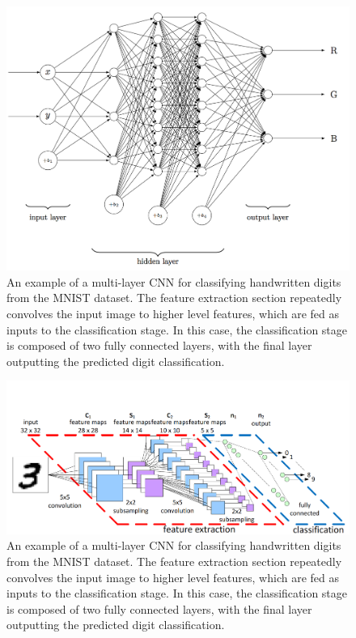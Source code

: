 \documentclass[12pt,oneside,onecolumn,a4paper]{article}
\begin{document}
\begin{figure}[h!]
\begin{center}
\includegraphics[width=0.7\columnwidth]{figures/doodle}
\caption{An example of a multi-layer CNN for classifying handwritten digits from the MNIST dataset. The feature extraction section repeatedly convolves the input image to higher level features, which are fed as inputs to the classification stage. In this case, the classification stage is composed of two fully connected layers, with the final layer outputting the predicted digit classification. \citep{peemen_mesman_corporaal_2011}%
}
\end{center}
\end{figure}


\begin{figure}[h!]
\begin{center}
\includegraphics[width=0.7\columnwidth]{figures/CNN/CNN}
\caption{An example of a multi-layer CNN for classifying handwritten digits from the MNIST dataset. The feature extraction section repeatedly convolves the input image to higher level features, which are fed as inputs to the classification stage. In this case, the classification stage is composed of two fully connected layers, with the final layer outputting the predicted digit classification. \citep{peemen_mesman_corporaal_2011}%
}
\end{center}
\end{figure}
\end{document}
